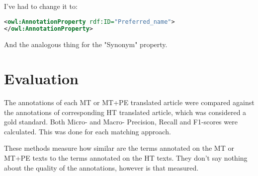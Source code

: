 I've had to change it to:


\begin{lstlisting}[language=xml]
<owl:AnnotationProperty rdf:ID="Preferred_name">
</owl:AnnotationProperty>
\end{lstlisting}


And the analogous thing for the "Synonym" property.

\section{Evaluation}

The annotations of each MT or MT+PE translated article were compared against the annotations of corresponding HT translated article, which was considered a gold standard. Both Micro- and Macro- Precision, Recall and F1-scores were calculated. This was done for each matching approach. 

These methods measure how similar are the terms annotated on the MT or MT+PE texts to the terms annotated on the HT texts. They don't say nothing about the quality of the annotations, however is that measured. 





 